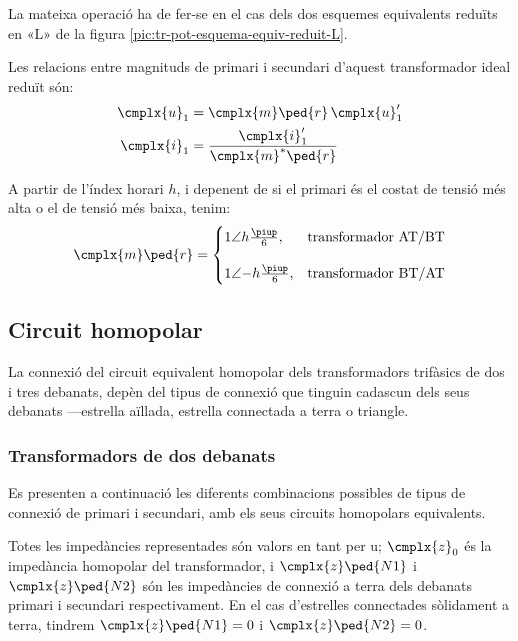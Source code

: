 La mateixa operació ha de fer-se en el cas dels dos esquemes equivalents reduïts en «L» de la figura \vref{pic:tr-pot-esquema-equiv-reduit-L}.

Les relacions entre magnituds de primari i secundari d'aquest transformador ideal reduït són:
\begin{subequations}
\begin{align}
    \cmplx{u}_1 &= \cmplx{m}\ped{r}\,\cmplx{u}'_1 \label{eq:UmU-reduit}\\
    \cmplx{i}_1 &= \frac{\cmplx{i}'_1}{\cmplx{m}^*\ped{r}} \label{eq:ImI-reduit}
\end{align}
\end{subequations}

A partir de l'índex horari $h$, i depenent de si el primari és el costat de tensió més alta o el de tensió més baixa, tenim:
\begin{equation}
\cmplx{m}\ped{r} = \begin{cases}
      1\angle h\frac{\piup}{6}, & \text{transformador AT/BT}\\[2.7ex]
      1\angle{-h}\frac{\piup}{6}, & \text{transformador BT/AT}
\end{cases}
\label{eq:rel-transf-cmplx-reduit}
\end{equation}


\subsection{Circuit homopolar}\label{sec:circuit_homopolar}

La connexió del circuit equivalent homopolar dels transformadors trifàsics de dos i tres debanats, depèn del tipus de connexió que tinguin cadascun dels seus debanats ---estrella aïllada, estrella connectada a terra o triangle.

\subsubsection{Transformadors de dos debanats}\label{sec:cir-hom-2-deb}

Es presenten a continuació les diferents combinacions possibles de tipus de connexió de primari i secundari, amb els seus circuits homopolars equivalents.

Totes les impedàncies representades són valors en tant per u; $\cmplx{z}_0$ és la impedància homopolar del transformador, i $\cmplx{z}\ped{N1}$ i $\cmplx{z}\ped{N2}$ són les impedàncies de connexió a terra dels debanats primari i secundari respectivament. En el cas d'estrelles connectades sòlidament a terra, tindrem $\cmplx{z}\ped{N1}=0$ i $\cmplx{z}\ped{N2}=0$.

